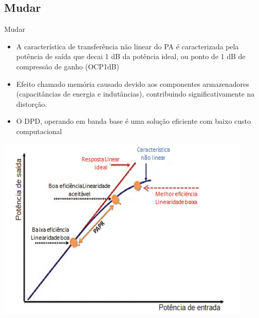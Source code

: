 \documentclass{if-beamer}
\begin{document}
\subsection{Mudar}
\begin{frame}{Mudar}
	
	\begin{minipage}{.49\textwidth}
		
		\begin{itemize}
			\item A característica de transferência não linear do PA 
			é caracterizada pela potência de saída que decai 			1 dB da potência ideal, ou ponto de 1 dB de 
			compressão de ganho (OCP1dB)
			\item  Efeito chamado memória causado devido aos 			componentes armazenadores (capacitâncias de energia e indutâncias), contribuindo significativamente na distorção.
			\item  O DPD, operando em banda base é uma solução 
			eficiente com baixo custo computacional
		
		\end{itemize}
		
		
	\end{minipage}
	\begin{minipage}{.49\textwidth}
		\includegraphics[scale=0.5]{curvasaidaparf.png}
	\end{minipage}
	
\end{frame}


\end{document}
